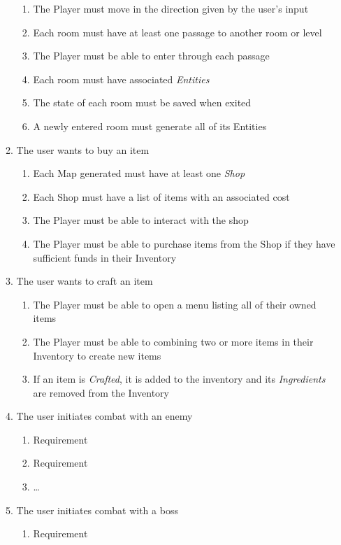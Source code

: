 \documentclass[12pt, titlepage]{article}
\begin{document}
\begin{enumerate}[{VP}1.]
\begin{enumerate}[{BE1}.1]
\begin{enumerate}
      \item The Player must move in the direction given by the user's input
      \item Each room must have at least one passage to another room or level
      \item The Player must be able to enter through each passage
      \item Each room must have associated \textit{Entities}
      \item The state of each room must be saved when exited
      \item A newly entered room must generate all of its Entities
    \end{enumerate}
    \item The user wants to buy an item
    \begin{enumerate}
      \item Each Map generated must have at least one \textit{Shop}
      \item Each Shop must have a list of items with an associated cost
      \item The Player must be able to interact with the shop
      \item The Player must be able to purchase items from the Shop if they have sufficient funds in their Inventory
    \end{enumerate}
    \item The user wants to craft an item
    \begin{enumerate}
      \item The Player must be able to open a menu listing all of their owned items
      \item The Player must be able to combining two or more items in their Inventory to create new items
      \item If an item is \textit{Crafted}, it is added to the inventory and its \textit{Ingredients} are removed from the Inventory
    \end{enumerate}
    \item The user initiates combat with an enemy
    \begin{enumerate}
      \item Requirement
      \item Requirement
      \item \dots
    \end{enumerate}
    \item The user initiates combat with a boss
    \begin{enumerate}
      \item Requirement

\end{enumerate}
\end{enumerate}
\end{enumerate}
\end{document}
